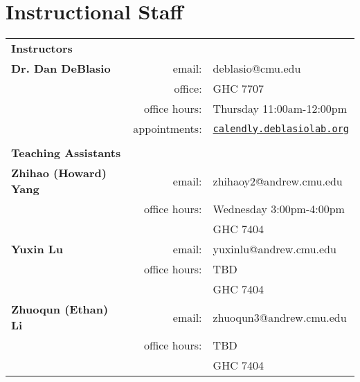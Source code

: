 \section{Instructional Staff}

\begin{tabular}{lrl}
\multicolumn{3}{l}{\Large \textbf{Instructors}}\vspace{0.75em}\\
\textbf{Dr. Dan DeBlasio}  
 & email: & deblasio@cmu.edu\\
 & office: & GHC 7707\\
& office hours:& Thursday 11:00am-12:00pm \\
& appointments: & \href{http://calendly.deblasiolab.org}{\texttt{calendly.deblasiolab.org}} \vspace{0.5em}\\

\\
\multicolumn{3}{l}{\Large \textbf{Teaching Assistants}}\vspace{0.75em}\\
%
\textbf{Zhihao (Howard) Yang}
 & email: & zhihaoy2@andrew.cmu.edu\\
 & office hours:& Wednesday 3:00pm-4:00pm\\
 && GHC 7404 \vspace{1em}\\

\textbf{Yuxin Lu}
 & email: & yuxinlu@andrew.cmu.edu\\
 & office hours:& TBD\\
 && GHC 7404\vspace{1em}\\

\textbf{Zhuoqun (Ethan) Li}
 & email: & zhuoqun3@andrew.cmu.edu\\
 & office hours:& TBD \\
 && GHC 7404\\



\end{tabular}